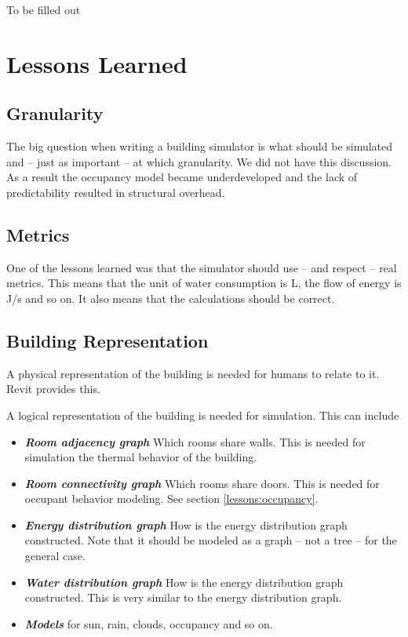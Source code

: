 \documentclass[10pt]{article}
\newcommand{\textdesc}[1]{\textit{\textbf{#1}}} %
\newcommand{\descitem}[1]{\item \textdesc{#1}}
\begin{document}

To be filled out


\section{Lessons Learned}
\label{sec:lessons}

\subsection{Granularity}

The big question when writing a building simulator is what should be simulated and -- just as important -- at which granularity. We did not have this discussion. As a result the occupancy model became underdeveloped and the lack of predictability resulted in structural overhead.

\subsection{Metrics}

One of the lessons learned was that the simulator should use -- and respect -- real metrics. This means that the unit of water consumption is L, the flow of energy is J/s and so on. It also means that the calculations should be correct.

\subsection{Building Representation}

A physical representation of the building is needed for humans to relate to it. Revit provides this.

A logical representation of the building is needed for simulation. This can include
\begin{itemize}
  \descitem{Room adjacency graph} Which rooms share walls. This is needed for simulation the thermal behavior of the building.
  \descitem{Room connectivity graph} Which rooms share doors. This is needed for occupant behavior modeling. See section \ref{lessons:occupancy}.
  \descitem{Energy distribution graph} How is the energy distribution graph constructed. Note that it should be modeled as a graph -- not a tree -- for the general case.
  \descitem{Water distribution graph} How is the energy distribution graph constructed. This is very similar to the energy distribution graph.
  \descitem{Models} for sun, rain, clouds, occupancy and so on.
\end{itemize}
\end{document}
